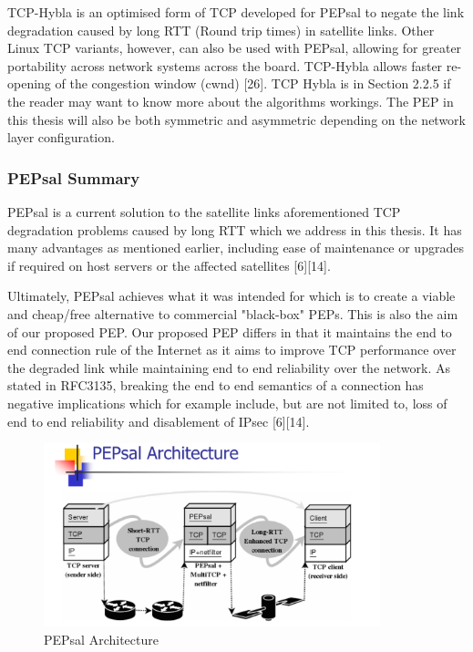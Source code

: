 \documentclass{uathesis}
\begin{document}
{TCP-Hybla} is an optimised form of TCP developed for PEPsal to negate the link degradation caused by long RTT (Round trip times) in satellite links.  Other Linux TCP variants, however, can also be used with PEPsal, allowing for greater portability across network systems across the board. TCP-Hybla allows faster re-opening of the congestion window (cwnd) [26]. TCP Hybla is in Section 2.2.5 if the reader may want to know more about the algorithms workings. The PEP in this thesis will also be both symmetric and asymmetric depending on the network layer configuration.\\

\subsubsection*{PEPsal Summary}
PEPsal is a current solution to the satellite links aforementioned TCP degradation problems caused by long RTT which we address in this thesis. It has many advantages as mentioned earlier, including ease of maintenance or upgrades if required on host servers or the affected satellites [6][14].

Ultimately, PEPsal achieves what it was intended for which is to create a viable and cheap/free alternative to commercial "black-box" PEPs. This is also the aim of our proposed PEP. Our proposed PEP differs in that it maintains the end to end connection rule of the Internet as it aims to improve TCP performance over the degraded link while maintaining end to end reliability over the network. As stated in RFC3135, breaking the end to end semantics of a connection has negative implications which for example include, but are not limited to, loss of end to end reliability and disablement of IPsec [6][14]. 

\begin{figure}[h!]
    \centering
    \includegraphics[width=0.87\textwidth]{PEPsal.PNG}
    \caption{PEPsal Architecture}
    \label{fig:PEPsal}
\end{figure}
\end{document}

